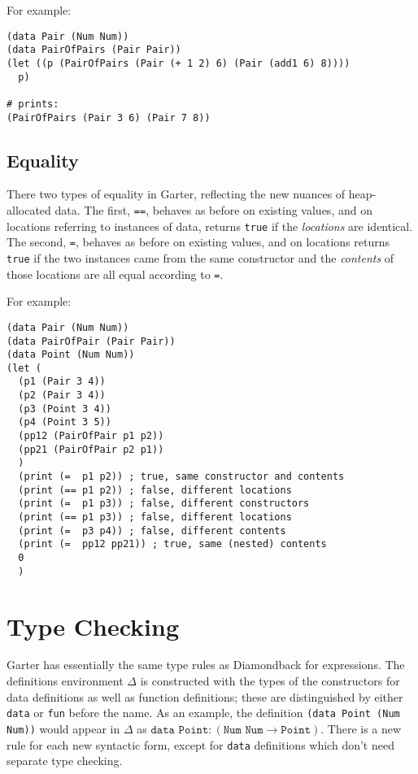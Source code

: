 \documentclass[10pt, oneside]{article}
\begin{document}
For example:

\begin{lstlisting}
(data Pair (Num Num))
(data PairOfPairs (Pair Pair))
(let ((p (PairOfPairs (Pair (+ 1 2) 6) (Pair (add1 6) 8))))
  p)

# prints:
(PairOfPairs (Pair 3 6) (Pair 7 8))
\end{lstlisting}

\subsection*{Equality}

There two types of equality in Garter, reflecting the new nuances of
heap-allocated data. The first, \texttt{==}, behaves as before on existing
values, and on locations referring to instances of data, returns
\texttt{true} if the \emph{locations} are identical. The second, \texttt{=},
behaves as before on existing values, and on locations returns \texttt{true}
if the two instances came from the same constructor and the \emph{contents}
of those locations are all equal according to \texttt{=}.

For example:

\begin{lstlisting}
(data Pair (Num Num))
(data PairOfPair (Pair Pair))
(data Point (Num Num))
(let (
  (p1 (Pair 3 4))
  (p2 (Pair 3 4))
  (p3 (Point 3 4))
  (p4 (Point 3 5))
  (pp12 (PairOfPair p1 p2))
  (pp21 (PairOfPair p2 p1))
  )
  (print (=  p1 p2)) ; true, same constructor and contents
  (print (== p1 p2)) ; false, different locations
  (print (=  p1 p3)) ; false, different constructors
  (print (== p1 p3)) ; false, different locations
  (print (=  p3 p4)) ; false, different contents
  (print (=  pp12 pp21)) ; true, same (nested) contents
  0
  )
\end{lstlisting}

\section*{Type Checking}

Garter has essentially the same type rules as Diamondback for expressions.
The definitions environment $\Delta$ is constructed with the types of the
constructors for data definitions as well as function definitions; these are
distinguished by either \texttt{data} or \texttt{fun} before the name. As an
example, the definition \texttt{(data Point (Num Num))} would appear in
$\Delta$ as $\texttt{data Point} : (\texttt{Num } \texttt{Num} \rightarrow
\texttt{Point})$. There is a new rule for each new syntactic form, except for
\texttt{data} definitions which don't need separate type checking.
\end{document}
